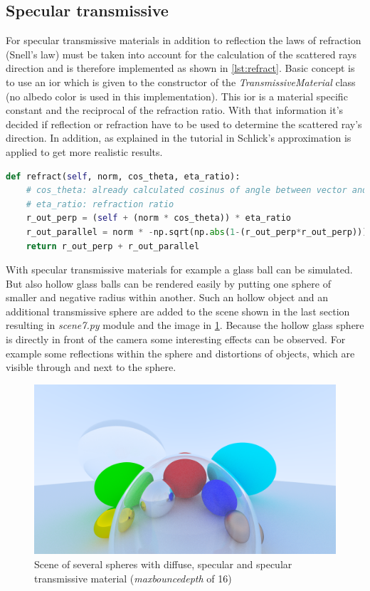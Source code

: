 \documentclass[]{article}
\begin{document}
		\subsection{Specular transmissive}
		For specular transmissive materials in addition to reflection the laws of refraction (Snell's law) must be taken into account for the calculation of the scattered rays direction and is therefore implemented as shown in \cref{lst:refract}. Basic concept is to use an \ac{ior} which is given to the constructor of the \emph{TransmissiveMaterial} class (no albedo color is used in this implementation). This \ac{ior} is a material specific constant and the reciprocal of the refraction ratio. With that information it's decided if reflection or refraction have to be used to determine the scattered ray's direction. In addition, as explained in the tutorial in \cite{Shirley2020RTW1} Schlick's approximation is applied to get more realistic results.
		
		\begin{lstlisting}[caption={Method for refracting a vector on a normal vector}, language=Python, label=lst:refract]
def refract(self, norm, cos_theta, eta_ratio):
	# cos_theta: already calculated cosinus of angle between vector and normal
	# eta_ratio: refraction ratio
	r_out_perp = (self + (norm * cos_theta)) * eta_ratio
	r_out_parallel = norm * -np.sqrt(np.abs(1-(r_out_perp*r_out_perp)))
	return r_out_perp + r_out_parallel			
		\end{lstlisting}
	
		With specular transmissive materials for example a glass ball can be simulated. But also hollow glass balls can be rendered easily by putting one sphere of smaller and negative radius within another. Such an hollow object and an additional transmissive sphere are added to the scene shown in the last section resulting in \emph{scene7.py} module and the image in \cref{fig:image7}. Because the hollow glass sphere is directly in front of the camera some interesting effects can be observed. For example some reflections within the sphere and distortions of objects, which are visible through and next to the sphere.
		
		\begin{figure}[h]
			\centering
			\includegraphics[width=0.9\linewidth]{image7-5}
			\caption{Scene of several spheres with diffuse, specular and specular transmissive material (\emph{max\textunderscore bounce\textunderscore depth} of 16)}
			\label{fig:image7}
		\end{figure}
				   
\end{document}
